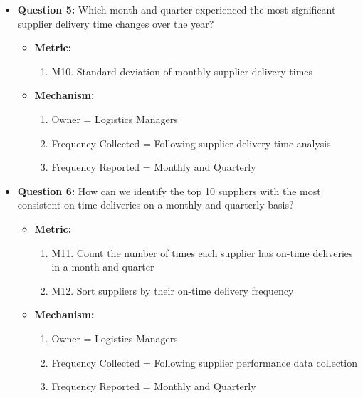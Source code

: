 \begin{itemize}[align=left, left=0em,labelsep=0em]
	\item[\textbullet\ ] \textbf{Question 5:} Which month and quarter experienced the most significant supplier delivery time changes over the year? 
	\begin{itemize}[align=left, left=0em,labelsep=0em]
		\item[] \textbf{Metric:}
		\begin{enumerate}[label={}, left=0em, labelwidth=1em, labelsep=0em, align=left]
			\item M10. Standard deviation of monthly supplier delivery times
		\end{enumerate}
		\item[] \textbf{Mechanism:}
		\begin{enumerate}[label={}, left=0em, labelwidth=1em, labelsep=0em, align=left]
			\item[i.] Owner = Logistics Managers
			\item[ii.] Frequency Collected = Following supplier delivery time analysis
			\item[iii.] Frequency Reported = Monthly and Quarterly
		\end{enumerate}
	\end{itemize}
	
	\item[\textbullet\ ] \textbf{Question 6:} How can we identify the top 10 suppliers with the most consistent on-time deliveries on a monthly and quarterly basis? 
	\begin{itemize}[align=left, left=0em,labelsep=0em]
		\item[] \textbf{Metric:}
		\begin{enumerate}[label={}, left=0em, labelwidth=1em, labelsep=0em, align=left]
			\item M11. Count the number of times each supplier has on-time deliveries in a month and quarter
			\item M12. Sort suppliers by their on-time delivery frequency
		\end{enumerate}
		\item[] \textbf{Mechanism:}
		\begin{enumerate}[label={}, left=0em, labelwidth=1em, labelsep=0em, align=left]
			\item[i.] Owner = Logistics Managers
			\item[ii.] Frequency Collected = Following supplier performance data collection
			\item[iii.] Frequency Reported = Monthly and Quarterly
		\end{enumerate}
	\end{itemize}
	

\end{itemize}
